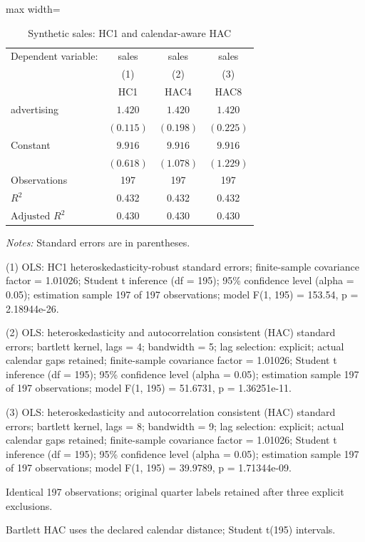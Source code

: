 \begin{table}[htbp]
\centering
\caption{Synthetic sales: HC1 and calendar-aware HAC}
\begingroup
\small
\setlength{\tabcolsep}{6pt}
\renewcommand{\arraystretch}{1.12}
\begin{adjustbox}{max width=\linewidth}
\begin{tabular}{@{}lccc@{}}
\toprule
Dependent variable: & sales & sales & sales \\
 & (1) & (2) & (3) \\
 & HC1 & HAC4 & HAC8 \\
\midrule
advertising & $1.420$ & $1.420$ & $1.420$ \\
 & $(0.115)$ & $(0.198)$ & $(0.225)$ \\[0.35em]
Constant & $9.916$ & $9.916$ & $9.916$ \\
 & $(0.618)$ & $(1.078)$ & $(1.229)$ \\[0.35em]
\midrule
Observations & 197 & 197 & 197 \\
$R^{2}$ & 0.432 & 0.432 & 0.432 \\
$\text{Adjusted }R^{2}$ & 0.430 & 0.430 & 0.430 \\
\bottomrule
\end{tabular}
\end{adjustbox}
\par\smallskip
\begin{minipage}{\linewidth}
\footnotesize
\raggedright
\textit{Notes:} Standard errors are in parentheses.\par
(1) OLS: HC1 heteroskedasticity-robust standard errors; finite-sample covariance factor = 1.01026; Student t inference (df = 195); 95\% confidence level (alpha = 0.05); estimation sample 197 of 197 observations; model F(1, 195) = 153.54, p = 2.18944e-26.\par
(2) OLS: heteroskedasticity and autocorrelation consistent (HAC) standard errors; bartlett kernel, lags = 4; bandwidth = 5; lag selection: explicit; actual calendar gaps retained; finite-sample covariance factor = 1.01026; Student t inference (df = 195); 95\% confidence level (alpha = 0.05); estimation sample 197 of 197 observations; model F(1, 195) = 51.6731, p = 1.36251e-11.\par
(3) OLS: heteroskedasticity and autocorrelation consistent (HAC) standard errors; bartlett kernel, lags = 8; bandwidth = 9; lag selection: explicit; actual calendar gaps retained; finite-sample covariance factor = 1.01026; Student t inference (df = 195); 95\% confidence level (alpha = 0.05); estimation sample 197 of 197 observations; model F(1, 195) = 39.9789, p = 1.71344e-09.\par
Identical 197 observations; original quarter labels retained after three explicit exclusions.\par
Bartlett HAC uses the declared calendar distance; Student t(195) intervals.\par
\end{minipage}
\endgroup
\end{table}
